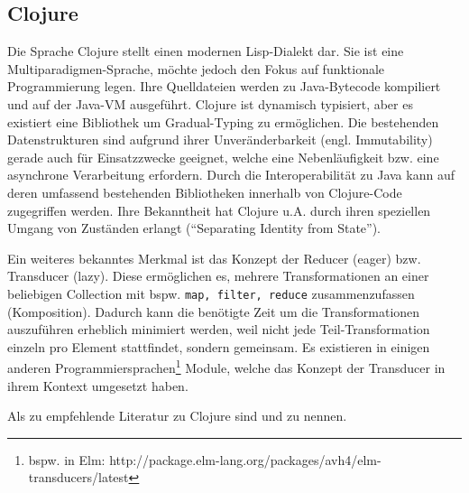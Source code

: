 \subsection{Clojure}
Die Sprache Clojure stellt einen modernen Lisp-Dialekt dar.
Sie ist eine Multiparadigmen-Sprache, möchte jedoch den Fokus auf funktionale Programmierung legen.
Ihre Quelldateien werden zu Java-Bytecode kompiliert und auf der Java-VM ausgeführt.
Clojure ist dynamisch typisiert, aber es existiert eine Bibliothek um Gradual-Typing zu ermöglichen.
Die bestehenden Datenstrukturen sind aufgrund ihrer Unveränderbarkeit (engl. Immutability) gerade auch für Einsatzzwecke geeignet, welche eine Nebenläufigkeit bzw. eine asynchrone Verarbeitung erfordern.
Durch die Interoperabilität zu Java kann auf deren umfassend bestehenden Bibliotheken innerhalb von Clojure-Code zugegriffen werden.
Ihre Bekanntheit hat Clojure \ac{u.A.} durch ihren speziellen Umgang von Zuständen erlangt ("`Separating Identity from State"').
\par
Ein weiteres bekanntes Merkmal ist das Konzept der Reducer (eager) bzw. Transducer (lazy).
Diese ermöglichen es, mehrere Transformationen an einer beliebigen Collection mit \ac{bspw.} \texttt{map, filter, reduce} zusammenzufassen (Komposition).
Dadurch kann die benötigte Zeit um die Transformationen auszuführen erheblich minimiert werden, weil nicht jede Teil-Transformation einzeln pro Element stattfindet, sondern gemeinsam.
Es existieren in einigen anderen Programmiersprachen\footnote{\ac{bspw.} in Elm: http://package.elm-lang.org/packages/avh4/elm-transducers/latest} Module, welche das Konzept der Transducer in ihrem Kontext umgesetzt haben.
\par Als zu empfehlende Literatur zu Clojure sind \cite{Butcher:2014:SCM:2621977} und\break \cite{Higginbotham:2015:CBT:2836843} zu nennen.

